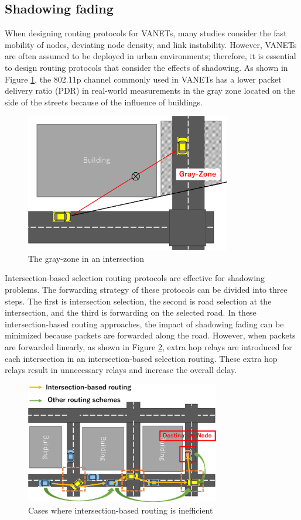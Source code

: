 \documentclass[conference]{IEEEtran}
\begin{document}
\subsection{Shadowing fading}
When designing routing protocols for VANETs, many studies consider the fast mobility of nodes, deviating node density, and link instability. 
However, VANETs are often assumed to be deployed in urban environments; therefore, it is essential to design routing protocols that consider the effects of shadowing.  
As shown in Figure \ref{fig:Gray-Zone}, the 802.11p channel commonly used in VANETs has a lower packet delivery ratio (PDR) in real-world measurements in the gray zone \cite{17} located on the side of the streets because of the influence of buildings.

\begin{figure}[!ht]
\centering
\includegraphics[width=90mm]{figures/Gray-Zone.eps}
\caption{The gray-zone in an intersection }
\label{fig:Gray-Zone}
\end{figure}



Intersection-based selection routing protocols \cite{24,25,26}  are effective for shadowing problems.
The forwarding strategy of these protocols can be divided into three steps. The first is intersection selection, the second is road selection at the intersection, and the third is forwarding on the selected road. 
In these intersection-based routing approaches, the impact of shadowing fading can be minimized because packets are forwarded along the road.
However, when packets are forwarded linearly, as shown in Figure \ref{fig:intersection_routing}, extra hop relays are introduced for each intersection in an intersection-based selection routing. These extra hop relays result in unnecessary relays and increase the overall delay.




\begin{figure}[!ht]
\centering
\includegraphics[width=85mm]{figures/intersection_routing.eps}
\caption{Cases where intersection-based routing is inefficient}
\label{fig:intersection_routing}
\end{figure}
\end{document}
